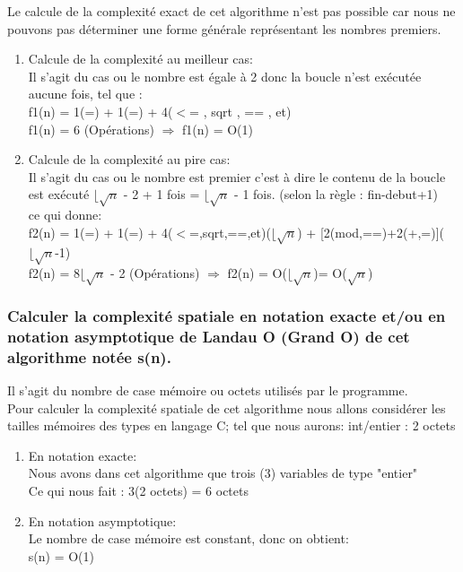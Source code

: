 \documentclass[12pt]{article}
\begin{document}
Le calcule de la complexité exact de cet algorithme n'est pas possible car nous ne pouvons pas déterminer une forme générale représentant les nombres premiers.
 
\begin{enumerate}
	\item Calcule de la complexité au meilleur cas:
	\\
	Il s'agit du cas ou le nombre est égale à 2 donc la boucle n'est exécutée aucune fois, tel que :
	\\
	f1(n) = 1(=) + 1(=) + 4($<$= , sqrt , == , et) 
	\\
	\color{blue}
	f1(n) = 6 (Opérations) $\Rightarrow$ f1(n) = O(1)
	\color{black}
	\\
	\item Calcule de la complexité au pire cas:
	\\
	Il s'agit du cas ou le nombre est premier c'est à dire le contenu de la boucle est exécuté $\lfloor{\sqrt{n}}$ - 2 + 1 fois = $\lfloor{\sqrt{n}}$ - 1 fois.
	(selon la règle : fin-debut+1)
	\\
	ce qui donne:
	\\
	f2(n) = 1(=) + 1(=) + 4($<$=,sqrt,==,et)($\lfloor{\sqrt{n}}$) + [2(mod,==)+2(+,=)]($\lfloor{\sqrt{n}}$-1) 
	\\
	\color{blue}
	f2(n) = 8$\lfloor{\sqrt{n}}$ - 2 (Opérations) $\Rightarrow$ f2(n) = O($\lfloor{\sqrt{n}}$)= O($\sqrt{n}$)
	\color{black}
\end{enumerate}




\subsubsection{Calculer la complexité spatiale en notation exacte et/ou en notation asymptotique de Landau O (Grand O) de  cet  algorithme notée s(n).}
Il s'agit du nombre de case mémoire ou octets utilisés par le programme.
\\
Pour calculer la complexité spatiale de cet algorithme nous allons considérer les tailles mémoires des types en langage C; tel que nous aurons:
int/entier : 2 octets
\\
\begin{enumerate}
	\item En notation exacte:
	\\
Nous avons dans cet algorithme que trois (3) variables de type "entier"
\\
Ce qui nous fait :
\color{blue}
 3(2 octets) = 6 octets
\color{black}
\\
 
	\item En notation asymptotique:
	\\
	Le nombre de case mémoire est constant, donc on obtient:
	\\
	\color{blue}
	s(n) = O(1)
	\color{black}
	
	
\end{enumerate}
\end{document}
